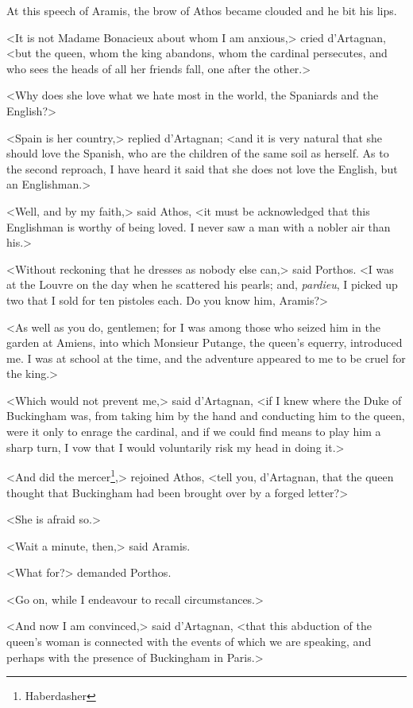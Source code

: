 At this speech of Aramis, the brow of Athos became clouded and he bit his lips. 

<It is not Madame Bonacieux about whom I am anxious,> cried d'Artagnan, <but the queen, whom the king abandons, whom the cardinal persecutes, and who sees the heads of all her friends fall, one after the other.> 

<Why does she love what we hate most in the world, the Spaniards and the English?> 

<Spain is her country,> replied d'Artagnan; <and it is very natural that she should love the Spanish, who are the children of the same soil as herself. As to the second reproach, I have heard it said that she does not love the English, but an Englishman.> 

<Well, and by my faith,> said Athos, <it must be acknowledged that this Englishman is worthy of being loved. I never saw a man with a nobler air than his.> 

<Without reckoning that he dresses as nobody else can,> said Porthos. <I was at the Louvre on the day when he scattered his pearls; and, \textit{pardieu}, I picked up two that I sold for ten pistoles each. Do you know him, Aramis?> 

<As well as you do, gentlemen; for I was among those who seized him in the garden at Amiens, into which Monsieur Putange, the queen's equerry, introduced me. I was at school at the time, and the adventure appeared to me to be cruel for the king.> 

<Which would not prevent me,> said d'Artagnan, <if I knew where the Duke of Buckingham was, from taking him by the hand and conducting him to the queen, were it only to enrage the cardinal, and if we could find means to play him a sharp turn, I vow that I would voluntarily risk my head in doing it.> 

<And did the mercer\footnote{Haberdasher},> rejoined Athos, <tell you, d'Artagnan, that the queen thought that Buckingham had been brought over by a forged letter?> 

<She is afraid so.> 

<Wait a minute, then,> said Aramis. 

<What for?> demanded Porthos. 

<Go on, while I endeavour to recall circumstances.> 

<And now I am convinced,> said d'Artagnan, <that this abduction of the queen's woman is connected with the events of which we are speaking, and perhaps with the presence of Buckingham in Paris.> 

